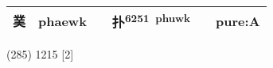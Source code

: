 \documentclass[14pt,a4paper]{scrartcl}
\begin{document}
\begin{longtable}[c]{@{}llllll@{}}
\begin{minipage}[t]{0.14\columnwidth}
菐
\strut\end{minipage} &
\begin{minipage}[t]{0.14\columnwidth}\raggedright\strut
phaewk
\strut\end{minipage} &
\begin{minipage}[t]{0.14\columnwidth}\raggedright\strut
\strut\end{minipage} &
\begin{minipage}[t]{0.14\columnwidth}\raggedright\strut
扑\textsuperscript{6251~phuwk}
\strut\end{minipage} &
\begin{minipage}[t]{0.14\columnwidth}\raggedright\strut
\strut\end{minipage} &
\begin{minipage}[t]{0.14\columnwidth}\raggedright\strut
pure:A
\strut\end{minipage}\tabularnewline
\bottomrule
\end{longtable}

(285) 1215 {[}2{]}
\end{document}
